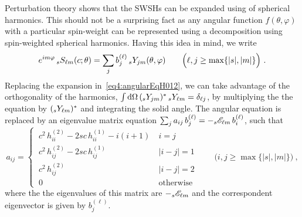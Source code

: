 Perturbation theory shows that the SWSHs can be expanded using of spherical harmonics.
This should not be a surprising fact as any angular function $f(\theta,\varphi)$ with a particular spin-weight can be represented using a decomposition using spin-weighted spherical harmonics.
Having this idea in mind, we write 
\begin{align}
	e^{i m \varphi} \, \uu[s]{S}{\ell m}(c; \theta) = \sum_{j} b_{j}^{(\ell)} \,\uu[s]{Y}{j m}(\theta,\varphi) \qquad \Big( \ell, j \ge \max\{|s|,|m|\} \Big) ~.
\end{align}
Replacing the expansion in~\eqref{eq4:angularEqH012}, we can take advantage of the orthogonality of the harmonics, $\int \dd\Omega \,(\uu[s]{Y}{j m})^* \,\uu[s]{Y}{\ell m} = \delta_{\ell j}$, by multiplying the the equation by $(\uu[s]{Y}{\ell m})^*$ and integrating the solid angle.
The angular equation is replaced by an eigenvalue matrix equation $\sum_{j} a_{ij} \, b_{j}^{(\ell)} = - \uu[s]{\mathscr{E}}{\ell m} \,b_{i}^{(\ell)}$, such that
\begin{equation}
	\label{eq4:spectralMatrix}
	a_{ij} =
	\begin{cases} 
		~c^2 \,h^{(2)}_{ii} - 2 s c \,h^{(1)}_{ii} - i(i+1) & ~ i=j \\[-0.5ex]
		~c^2 \,h^{(2)}_{ij} - 2 s c \,h^{(1)}_{ij} & ~ |i-j|=1 \\[-0.5ex]
		~c^2 \,h^{(2)}_{ij} & ~ |i-j|=2 \\[-0.5ex]
		~0 & ~\text{otherwise}
	\end{cases}  \qquad \Big( i, j \ge \max\{|s|,|m|\} \Big) ~,
\end{equation}
where the the eigenvalues of this matrix are $-\uu[s]{\mathscr{E}}{\ell m}$ and the correspondent eigenvector is given by $b_j^{(\ell)}$.


